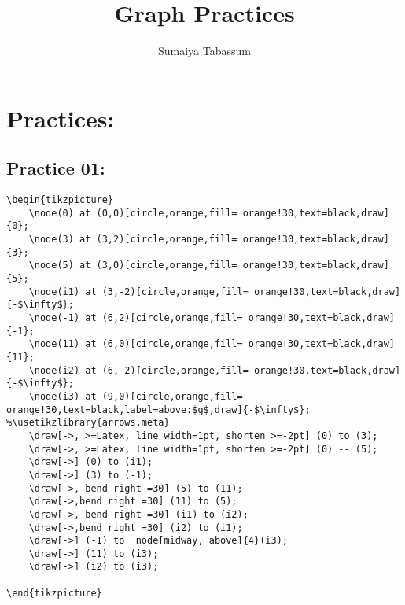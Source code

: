 \documentclass{article}
\title{Graph Practices}
\author{Sumaiya Tabassum}
\begin{document}
	\maketitle
{}
	
\section{Practices:}

\subsection{Practice 01:}
\begin{lstlisting}
\begin{tikzpicture}
	\node(0) at (0,0)[circle,orange,fill= orange!30,text=black,draw]{0};
	\node(3) at (3,2)[circle,orange,fill= orange!30,text=black,draw]{3};
	\node(5) at (3,0)[circle,orange,fill= orange!30,text=black,draw]{5};
	\node(i1) at (3,-2)[circle,orange,fill= orange!30,text=black,draw]{-$\infty$};
	\node(-1) at (6,2)[circle,orange,fill= orange!30,text=black,draw]{-1};
	\node(11) at (6,0)[circle,orange,fill= orange!30,text=black,draw]{11};
	\node(i2) at (6,-2)[circle,orange,fill= orange!30,text=black,draw]{-$\infty$};
	\node(i3) at (9,0)[circle,orange,fill= orange!30,text=black,label=above:$g$,draw]{-$\infty$};
%\usetikzlibrary{arrows.meta}
	\draw[->, >=Latex, line width=1pt, shorten >=-2pt] (0) to (3);
	\draw[->, >=Latex, line width=1pt, shorten >=-2pt] (0) -- (5);
	\draw[->] (0) to (i1);
	\draw[->] (3) to (-1);
	\draw[->, bend right =30] (5) to (11);
	\draw[->,bend right =30] (11) to (5);
	\draw[->, bend right =30] (i1) to (i2);
	\draw[->,bend right =30] (i2) to (i1);
	\draw[->] (-1) to  node[midway, above]{4}(i3);
	\draw[->] (11) to (i3);
	\draw[->] (i2) to (i3);
				
\end{tikzpicture}
\end{lstlisting}
\end{document}
